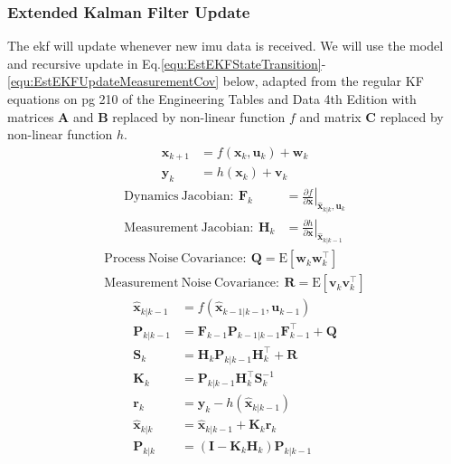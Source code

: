 \documentclass{report_template_oxford}
\begin{document}
\subsubsection{Extended Kalman Filter Update}
The \gls{ekf} will update whenever new \gls{imu} data is received. We will use the model and recursive update in Eq.\ref{equ:EstEKFStateTransition}-\ref{equ:EstEKFUpdateMeasurementCov} below, adapted from the regular KF equations on pg 210 of the Engineering Tables and Data 4th Edition \cite{HLT} with matrices $\mathbf{A}$ and $\mathbf{B}$ replaced by non-linear function $f$ and matrix $\mathbf{C}$ replaced by non-linear function $h$.
\begin{align}
    \mathbf{x}_{k+1} & = f(\mathbf{x}_k,\mathbf{u}_k) + \mathbf{w}_k \label{equ:EstEKFStateTransition} \\
    \mathbf{y}_k & = h(\mathbf{x}_k) + \mathbf{v}_k  \label{equ:EstEKFMeasurements}
\end{align}
\vspace{-1.5cm}
\begin{align}
    \mathrm{Dynamics\ Jacobian: \ } \mathbf{F}_{k} & = \left. \frac{\partial f}{\partial \mathbf{x}} \right|_{\hat{\mathbf{x}}_{k|k}, \mathbf{u}_k}\label{equ:EstEKFDynamicsJacobian} \\
    \mathrm{Measurement\ Jacobian: \ } \mathbf{H}_k & = \left. \frac{\partial h}{\partial \mathbf{x}} \right|_{\hat{\mathbf{x}}_{k|k-1}} \label{equ:EstEKFMeasurementJacobian}
\end{align}
\vspace{-1.5cm}
\begin{align}
    \mathrm{Process\ Noise\ Covariance: \ } \mathbf{Q} = \mathrm{E}[\mathbf{w}_k \mathbf{w}_k^\top] \label{equ:EstEKFProcessNoiseCov} \\
    \mathrm{Measurement\ Noise\ Covariance: \ } \mathbf{R} = \mathrm{E}[\mathbf{v}_k \mathbf{v}_k^\top]  \label{equ:EstEKFMeasurementNoiseCov}
\end{align}
\vspace{-1.5cm}
\begin{align}
    \hat{\mathbf{x}}_{k|k-1} & = f(\hat{\mathbf{x}}_{k-1|k-1},\mathbf{u}_{k-1}) \label{equ:EstEKFUpdatePredictionState} \\
    \mathbf{P}_{k|k-1} & = \mathbf{F}_{k-1} \mathbf{P}_{k-1|k-1} \mathbf{F}_{k-1}^\top + \mathbf{Q} \label{equ:EstEKFUpdatePredictionCov} \\
    \mathbf{S}_k & = \mathbf{H}_k \mathbf{P}_{k|k-1} \mathbf{H}_k^\top + \mathbf{R} \label{equ:EstEKFUpdateMeasurementS} \\
    \mathbf{K}_k & = \mathbf{P}_{k|k-1} \mathbf{H}_k^\top \mathbf{S}_k^{-1} \label{equ:EstEKFUpdateMeasurementK} \\
    \mathbf{r}_k & = \mathbf{y}_k - h(\hat{\mathbf{x}}_{k|k-1}) \label{equ:EstEKFUpdateMeasurementResidual} \\
    \hat{\mathbf{x}}_{k|k} & = \hat{\mathbf{x}}_{k|k-1} + \mathbf{K}_k \mathbf{r}_k \label{equ:EstEKFUpdateMeasurementState} \\
    \mathbf{P}_{k|k} & = (\mathbf{I} - \mathbf{K}_k \mathbf{H}_k) \mathbf{P}_{k|k-1} \label{equ:EstEKFUpdateMeasurementCov} 
\end{align}
\end{document}
